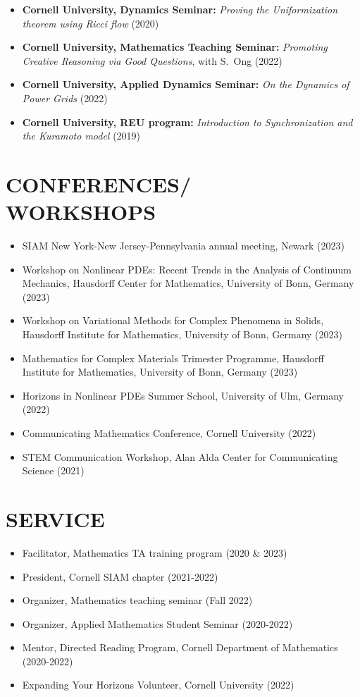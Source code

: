 \documentclass[margin]{res} %
\begin{document}
\begin{resume}
\begin{itemize}
	\item \textbf{Cornell University, Dynamics Seminar:} \textit{Proving the Uniformization theorem using Ricci flow} (2020)
	\item \textbf{Cornell University, Mathematics Teaching Seminar:} \textit{Promoting Creative Reasoning via Good Questions}, with S.~Ong (2022)
	\item \textbf{Cornell University, Applied Dynamics Seminar:} \textit{On the Dynamics of Power Grids} (2022)
	\item \textbf{Cornell University, REU program:} \textit{Introduction to Synchronization and the Kuramoto model} (2019)
\end{itemize}

\section{CONFERENCES/\\WORKSHOPS}
\begin{itemize}
	\item SIAM New York-New Jersey-Pennsylvania annual meeting, Newark (2023)
	\item Workshop on Nonlinear PDEs: Recent Trends in the Analysis of Continuum Mechanics, Hausdorff Center for Mathematics, University of Bonn, Germany (2023)
	\item Workshop on Variational Methods for Complex Phenomena in Solids, Hausdorff Institute for Mathematics, University of Bonn, Germany (2023)
	\item Mathematics for Complex Materials Trimester Programme, Hausdorff Institute for Mathematics, University of Bonn, Germany (2023)
	\item Horizons in Nonlinear PDEs Summer School, University of Ulm, Germany (2022)
	\item Communicating Mathematics Conference, Cornell University (2022)
	\item STEM Communication Workshop, Alan Alda Center for Communicating Science (2021)
\end{itemize}

\section{SERVICE}
\begin{itemize}
	\item Facilitator, Mathematics TA training program (2020 \& 2023)
	\item President, Cornell SIAM chapter (2021-2022)
	\item Organizer, Mathematics teaching seminar (Fall 2022)
	\item Organizer, Applied Mathematics Student Seminar (2020-2022)
	\item Mentor, Directed Reading Program, Cornell Department of Mathematics (2020-2022)
	\item Expanding Your Horizons Volunteer, Cornell University (2022)
\end{itemize}


\end{resume}
\end{document}

